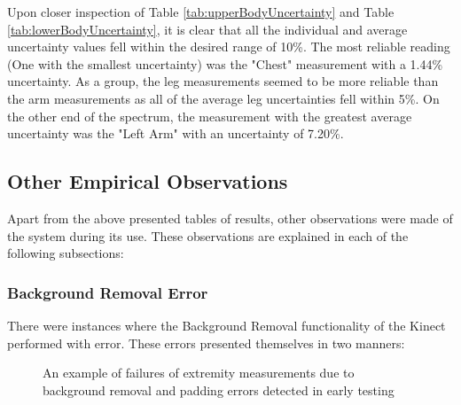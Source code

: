 Upon closer inspection of Table \ref{tab:upperBodyUncertainty} and Table \ref{tab:lowerBodyUncertainty}, it is clear that all the individual and average uncertainty values fell within the desired range of 10\%. The most reliable reading (One with the smallest uncertainty) was the "Chest" measurement with a 1.44\% uncertainty. As a group, the leg measurements seemed to be more reliable than the arm measurements as all of the average leg uncertainties fell within 5\%. On the other end of the spectrum, the measurement with the greatest average uncertainty was the "Left Arm" with an uncertainty of 7.20\%.

\subsection{Other Empirical Observations}

Apart from the above presented tables of results, other observations were made of the system during its use. These observations are explained in each of the following subsections:

\subsubsection{Background Removal Error} \label{backgroundRemovalError}
There were instances where the Background Removal functionality of the Kinect performed with error. These errors presented themselves in two manners:

\begin{figure}[ht]
	\centering
	{%
		\setlength{\fboxsep}{0pt}%
		\setlength{\fboxrule}{0.5pt}%
		}
	\caption{An example of failures of extremity measurements due to background removal and padding errors detected in early testing}
	\label{fig:errorExample}
\end{figure}

